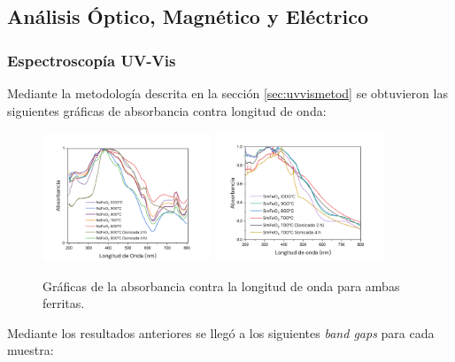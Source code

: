 \documentclass[../main.tex]{subfiles}
\begin{document}
\subsection{Análisis Óptico, Magnético y Eléctrico} \label{sec:analisisoptmagelec}
\subsubsection{Espectroscopía UV-Vis}
Mediante la metodología descrita en la sección \ref{sec:uvvismetod} se obtuvieron las siguientes gráficas de absorbancia contra longitud de onda:
\begin{figure}[H]
    \centering
    \includegraphics[width=0.45\textwidth]{fig/absorbancianeod.png}
    \quad
    \includegraphics[width=0.45\textwidth]{fig/absorbanciasama.png}
    \caption{Gráficas de la absorbancia contra la longitud de onda para ambas ferritas.}
    \label{fig:absorbres}
\end{figure}
Mediante los resultados anteriores se llegó a los siguientes \textit{band gaps} para cada muestra:
\end{document}
